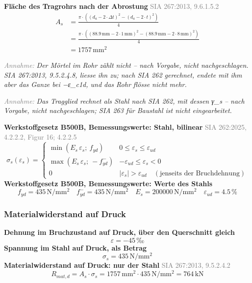\documentclass[11pt,a4paper]{article}
\newcommand{\normref}[1]{{\small\textcolor{gray}{#1}}}
\newcommand{\hinweis}[2]{\par\noindent\textcolor{gray}{\textit{#1:}} \textit{#2}\par}
\begin{document}
\noindent\textbf{Fläche des Tragrohrs nach der Abrostung} \hfill \normref{SIA 267:2013, 9.6.1.5.2}
\begin{equation*}
\begin{aligned}
  A_s &= \frac{\pi \cdot \left(\left(d_a - 2 \cdot \Delta t\right)^{2} - \left(d_a - 2 \cdot t\right)^{2}\right)}{4} \\
  &= \frac{\pi \cdot \left(\left(88.9\,\mathrm{mm} - 2 \cdot 1\,\mathrm{mm}\right)^{2} - \left(88.9\,\mathrm{mm} - 2 \cdot 8\,\mathrm{mm}\right)^{2}\right)}{4} \\
  &= 1757\,\mathrm{mm}^{2}
\end{aligned}
\end{equation*}
\hinweis{Annahme}{Der Mörtel im Rohr zählt nicht -- nach Vorgabe, nicht nachgeschlagen. SIA 267:2013, 9.5.2.4.8, liesse ihn zu; nach SIA 262 gerechnet, endete mit ihm aber das Ganze bei −ε\_c1d, und das Rohr flösse nicht mehr.}
\hinweis{Annahme}{Das Tragglied rechnet als Stahl nach SIA 262, mit dessen γ\_s -- nach Vorgabe, nicht nachgeschlagen; SIA 263 für Baustahl ist nicht eingearbeitet.}
\noindent\textbf{Werkstoffgesetz B500B, Bemessungswerte: Stahl, bilinear} \hfill \normref{SIA 262:2025, 4.2.2.2, Figur 16; 4.2.2.5}
\begin{equation*}
\sigma_s(\varepsilon_s) = \begin{cases} \min(E_s\,\varepsilon_s;\ f_{yd}) & 0 \le \varepsilon_s \le \varepsilon_{ud} \\[1ex] \max(E_s\,\varepsilon_s;\ -f_{yd}^{-}) & -\varepsilon_{ud} \le \varepsilon_s < 0 \\[1ex] 0 & |\varepsilon_s| > \varepsilon_{ud} \quad (\text{jenseits der Bruchdehnung}) \end{cases}
\end{equation*}
\noindent\textbf{Werkstoffgesetz B500B, Bemessungswerte: Werte des Stahls}
\begin{equation*}
f_{yd} = 435\,\mathrm{N}/\mathrm{mm}^{2} \quad f_{yd}^{-} = 435\,\mathrm{N}/\mathrm{mm}^{2} \quad E_s = 200000\,\mathrm{N}/\mathrm{mm}^{2} \quad \varepsilon_{ud} = 4.5\,\%
\end{equation*}
\subsubsection{Materialwiderstand auf Druck}
\noindent\textbf{Dehnung im Bruchzustand auf Druck, über den Querschnitt gleich}
\begin{equation*}
\varepsilon = -45\,\text{‰}
\end{equation*}
\noindent\textbf{Spannung im Stahl auf Druck, als Betrag}
\begin{equation*}
\sigma_s = 435\,\mathrm{N}/\mathrm{mm}^{2}
\end{equation*}
\noindent\textbf{Materialwiderstand auf Druck: nur der Stahl} \hfill \normref{SIA 267:2013, 9.5.2.4.2}
\begin{equation*}
R_{mat,d} = A_s \cdot \sigma_s = 1757\,\mathrm{mm}^{2} \cdot 435\,\mathrm{N}/\mathrm{mm}^{2} = 764\,\mathrm{kN}
\end{equation*}
\end{document}
